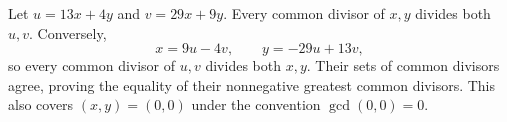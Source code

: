 Let $u=13x+4y$ and $v=29x+9y$. Every common divisor of $x,y$ divides both $u,v$. Conversely,
\[
x=9u-4v,\qquad y=-29u+13v,
\]
so every common divisor of $u,v$ divides both $x,y$. Their sets of common divisors agree, proving the equality of their nonnegative greatest common divisors. This also covers $(x,y)=(0,0)$ under the convention $\gcd(0,0)=0$.
